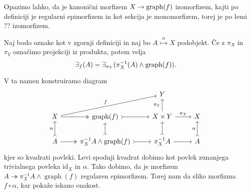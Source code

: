 \documentclass[../kategoricna_logika.tex]{subfiles}
\begin{document}
Opazimo lahko, da je kanonični morfizem $X \to \operatorname{graph}(f)$ izomorfizem,
kajti po definiciji je regularni epimorfizem
in kot sekcija je monomorfizem, torej je po lemi ?? izomorfizem.
\begin{lema}
  Naj bodo oznake kot v zgornji definiciji in naj bo $A \overset{\alpha}{\rightarrowtail} X$ podobjekt. Če z $\pi_X$ in $\pi_Y$ označimo projekciji iz produkta, potem velja
  $$\exists_f(A) = \exists_{\pi_Y}(\pi_X^{-1}(A) \wedge \operatorname{graph}(f)).$$
\end{lema}
\begin{dokaz}
  V ta namen konstruiramo diagram
  \begin{equation*}
  \begin{tikzcd}
    & & Y & \\
    X \ar[urr, "f"] \ar[r, two heads] & \operatorname{graph}(f) \ar[r, tail] & X \times Y \ar[u, "\pi_Y"] \ar[r, "\pi_X"] & X \\
    A \ar[u, tail, "\alpha"] \ar[r, two heads] & \pi_X^{-1}A \land \operatorname{graph}(f) \ar[u, tail] \ar[r, tail] & \pi_X^{-1}A \ar[u, tail] \ar[r] & A \ar[u, tail, "\alpha"]
  \end{tikzcd}
  \end{equation*}
  kjer so kvadrati povleki.
  Levi spodnji kvadrat dobimo kot povlek zunanjega trivialnega povleka $\mathrm{id}_X$ in $\alpha$.
  Tako dobimo, da je morfizem $A \twoheadrightarrow \pi_X^{-1}A \land \operatorname{graph}(f)$ regularen epimorfizem.
  Torej nam da sliko morfizma $f \circ \alpha$, kar pokaže iskano enakost.
\end{dokaz}
\end{document}
